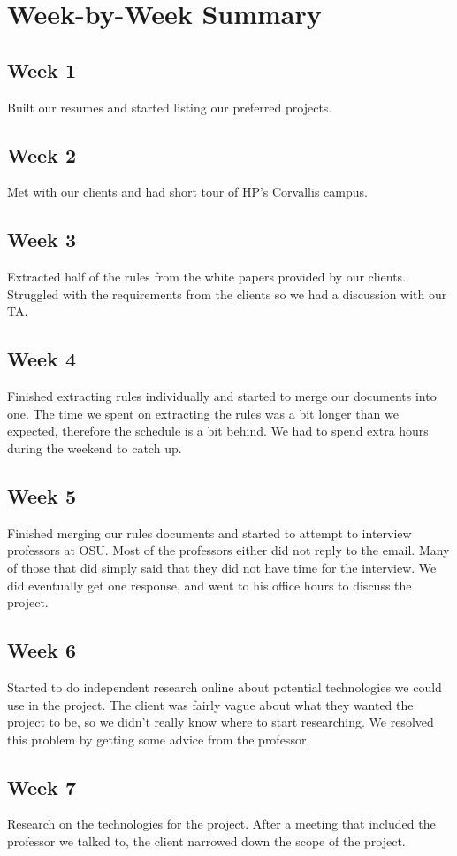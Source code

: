 \documentclass[onecolumn, draftclsnofoot,10pt, compsoc]{IEEEtran}
\begin{document}
\section{Week-by-Week Summary}
\subsection{Week 1}
Built our resumes and started listing our preferred projects.
\subsection{Week 2}
Met with our clients and had short tour of HP's Corvallis campus.
\subsection{Week 3}
Extracted half of the rules from the white papers provided by our clients. Struggled with the requirements from the clients so we had a discussion with our TA.
\subsection{Week 4}
Finished extracting rules individually and started to merge our documents into one. The time we spent on extracting the rules was a bit longer than we expected, therefore the schedule is a bit behind. We had to spend extra hours during the weekend to catch up. 
\subsection{Week 5}
Finished merging our rules documents and started to attempt to interview professors at OSU. Most of the professors either did not reply to the email. Many of those that did simply said that they did not have time for the interview. We did eventually get one response, and went to his office hours to discuss the project.
\subsection{Week 6}
Started to do independent research online about potential technologies we could use in the project. The client was fairly vague about what they wanted the project to be, so we didn't really know where to start researching. We resolved this problem by getting some advice from the professor.
\subsection{Week 7}
Research on the technologies for the project. After a meeting that included the professor we talked to, the client narrowed down the scope of the project.
\end{document}
